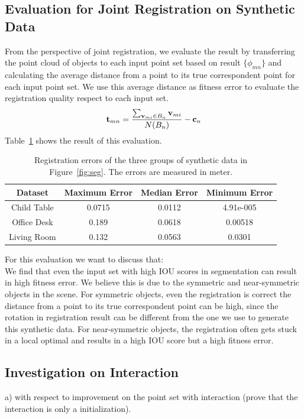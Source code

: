 \subsection{Evaluation for Joint Registration on Synthetic Data}
%
From the perspective of joint registration, we evaluate the result by transferring the point cloud of objects to each input point set based on result $\{\phi_{mn}\}$ and calculating the average distance from a point to its true correspondent point for each input point set.
%
We use this average distance as fitness error to evaluate the registration quality respect to each input set.
\begin{equation}
\label{equ:error}
\mathbf{t}_{mn}=\frac{\sum_{\mathbf{v}_{mi} \in B_n}\mathbf{v}_{mi}}{N(B_n)}-\mathbf{c}_n
\end{equation}
Table~\ref{tab:regerror} shows the result of this evaluation.
\begin{table}
	\centering
	\begin{tabular}{c c c c}
		Dataset & Maximum Error & Median Error & Minimum Error \\
		\hline
		Child Table & 0.0715 & 0.0112 & 4.91e-005 \\   
		Office Desk & 0.189  & 0.0618 & 0.00518 \\
		Living Room & 0.132  & 0.0563 & 0.0301\\
	\end{tabular}
	\caption{Registration errors of the three groups of synthetic data in Figure~\ref{fig:seg}. The errors are measured in meter. }
	\label{tab:regerror}
\end{table}
For this evaluation we want to discuss that:\\
We find that even the input set with high IOU scores in segmentation can result in high fitness error. We believe this is due to the symmetric and near-symmetric objects in the scene. For symmetric objects, even the registration is correct the distance from a point to its true correspondent point can be high, since the rotation in registration result can be different from the one we use to generate this synthetic data. For near-symmetric objects, the registration often gets stuck in a local optimal and results in a high IOU score but a high fitness error.

\subsection{Investigation on Interaction}
a) with respect to improvement on the point set with interaction (prove that the interaction is only a initialization).

